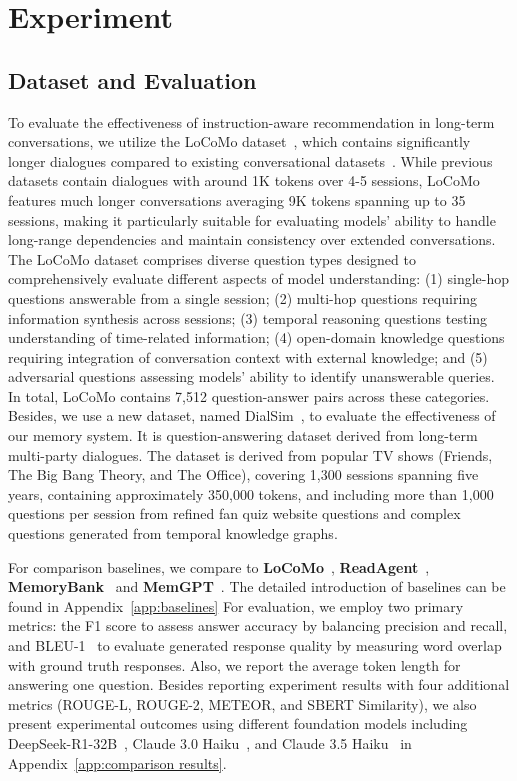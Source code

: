 \documentclass{article}
\begin{document}
\section{Experiment}
\subsection{Dataset and Evaluation}
To evaluate the effectiveness of instruction-aware recommendation in long-term conversations, we utilize the LoCoMo dataset~\cite{locomo}, which contains significantly longer dialogues compared to existing conversational datasets~\cite{xu2021beyond,jang2023conversation}. While previous datasets contain dialogues with around 1K tokens over 4-5 sessions, LoCoMo features much longer conversations averaging 9K tokens spanning up to 35 sessions, making it particularly suitable for evaluating models' ability to handle long-range dependencies and maintain consistency over extended conversations.
The LoCoMo dataset comprises diverse question types designed to comprehensively evaluate different aspects of model understanding: (1) single-hop questions answerable from a single session; (2) multi-hop questions requiring information synthesis across sessions; (3) temporal reasoning questions testing understanding of time-related information; (4) open-domain knowledge questions requiring integration of conversation context with external knowledge; and (5) adversarial questions assessing models' ability to identify unanswerable queries. In total, LoCoMo contains 7,512 question-answer pairs across these categories. Besides, we use a new dataset, named DialSim~\cite{kim2024dialsim}, to evaluate the effectiveness of our memory system. It is question-answering dataset derived from long-term multi-party dialogues. The dataset is derived from popular TV shows (Friends, The Big Bang Theory, and The Office), covering 1,300 sessions spanning five years, containing approximately 350,000 tokens, and including more than 1,000 questions per session from refined fan quiz website questions and complex questions generated from temporal knowledge graphs.

For comparison baselines, we compare to \textbf{LoCoMo}~\cite{locomo}, \textbf{ReadAgent}~\cite{readagent}, \textbf{MemoryBank}~\cite{memorybank} and \textbf{MemGPT}~\cite{memgpt}. The detailed introduction of baselines can be found in Appendix~\ref{app:baselines} For evaluation, we employ two primary metrics: the F1 score to assess answer accuracy by balancing precision and recall, and BLEU-1~\cite{papineni2002bleu} to evaluate generated response quality by measuring word overlap with ground truth responses. Also, we report the average token length for answering one question. Besides reporting experiment results with four additional metrics (ROUGE-L, ROUGE-2, METEOR, and SBERT Similarity), we also present experimental outcomes using different foundation models including DeepSeek-R1-32B~\cite{guo2025deepseek}, Claude 3.0 Haiku~\cite{anthropic2024claude3}, and Claude 3.5 Haiku~\cite{anthropic2025claude35} in Appendix~\ref{app:comparison results}.
\end{document}
